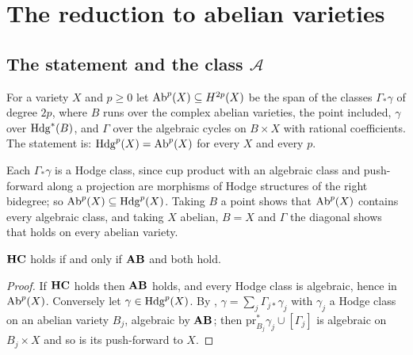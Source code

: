 \section{The reduction to abelian varieties}\label{sec:reduction}

\subsection{The statement \Fiii{} and the class \texorpdfstring{$\mathcal{A}$}{A}}

\begin{definition}\label{def:f3prime}
For a variety $X$ and $p\ge0$ let $\mathrm{Ab}^{p}(X)\subseteq H^{2p}(X)$ be the span of the classes $\Gamma_{*}\gamma$ of degree $2p$, where $B$ runs over the complex abelian varieties, the point included, $\gamma$ over $\mathrm{Hdg}^{*}(B)$, and $\Gamma$ over the algebraic cycles on $B\times X$ with rational coefficients. The statement \Fiii{} is: $\mathrm{Hdg}^{p}(X)=\mathrm{Ab}^{p}(X)$ for every $X$ and every $p$.
\end{definition}

Each $\Gamma_{*}\gamma$ is a Hodge class, since cup product with an algebraic class and push-forward along a projection are morphisms of Hodge structures of the right bidegree; so $\mathrm{Ab}^{p}(X)\subseteq\mathrm{Hdg}^{p}(X)$. Taking $B$ a point shows that $\mathrm{Ab}^{p}(X)$ contains every algebraic class, and taking $X$ abelian, $B=X$ and $\Gamma$ the diagonal shows that \Fiii{} holds on every abelian variety.

\begin{proposition}\label{prop:hc-split}
$\mathbf{HC}$ holds if and only if $\mathbf{AB}$ and \Fiii{} both hold.
\end{proposition}

\begin{proof}
If $\mathbf{HC}$ holds then $\mathbf{AB}$ holds, and every Hodge class is algebraic, hence in $\mathrm{Ab}^{p}(X)$. Conversely let $\gamma\in\mathrm{Hdg}^{p}(X)$. By \Fiii{}, $\gamma=\sum_{j}\Gamma_{j*}\gamma_{j}$ with $\gamma_{j}$ a Hodge class on an abelian variety $B_{j}$, algebraic by $\mathbf{AB}$; then $\mathrm{pr}_{B_{j}}^{*}\gamma_{j}\cup[\Gamma_{j}]$ is algebraic on $B_{j}\times X$ and so is its push-forward to $X$.
\end{proof}


